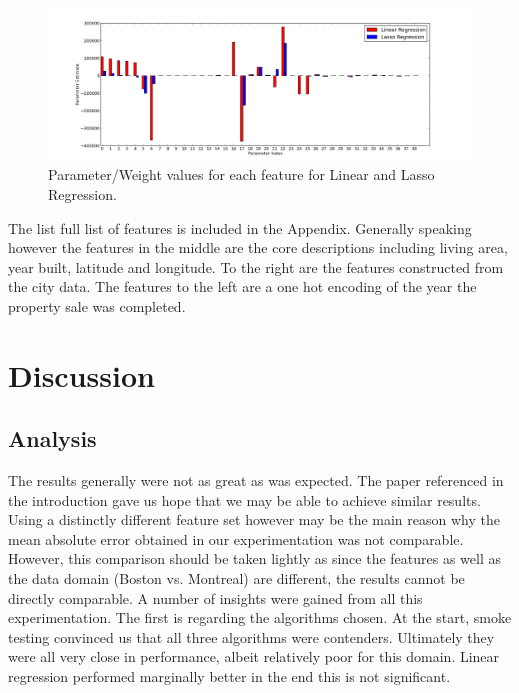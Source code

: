 \documentclass{acm_proc_article-sp}
\begin{document}
	 \begin{figure}[!htbp]
   		\centering
  		\includegraphics[width=\textwidth]{parameter_values.png}
    		\caption{Parameter/Weight values for each feature for Linear and Lasso Regression.}
    		\label{fig:feats}
	\end{figure}
	
	The list full list of features is included in the Appendix. Generally speaking however the features in the middle are the core descriptions including living area, year built, latitude and longitude. To the right are the features constructed from the city data. The features to the left are a one hot encoding of the year the property sale was completed.

\section{Discussion}

\subsection{Analysis}
	The results generally were not as great as was expected. The paper referenced in the introduction \cite{bostonres} gave us hope that we may be able to achieve similar results. Using a distinctly different feature set however may be the main reason why the mean absolute error obtained in our experimentation was not comparable. However, this comparison should be taken lightly as since the features as well as the data domain (Boston vs. Montreal) are different, the results cannot be directly comparable. A number of insights were gained from all this experimentation. The first is regarding the algorithms chosen. At the start, smoke testing convinced us that all three algorithms were contenders. Ultimately they were all very close in performance, albeit relatively poor for this domain. Linear regression performed marginally better in the end this is not significant.
	
\end{document}
